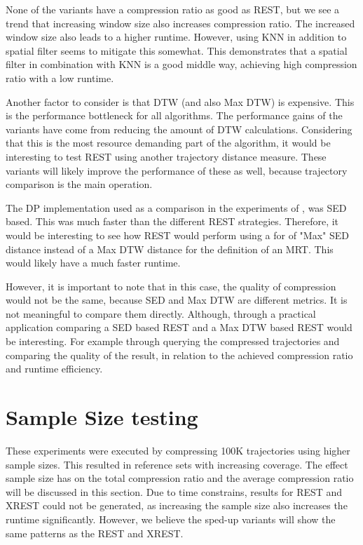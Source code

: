 None of the variants have a compression ratio as good as REST, but we see a trend that increasing window size also increases compression ratio. The increased window size also leads to a higher runtime. However, using KNN in addition to spatial filter seems to mitigate this somewhat. This demonstrates that a spatial filter in combination with KNN is a good middle way, achieving high compression ratio with a low runtime.

Another factor to consider is that DTW (and also Max DTW) is expensive. This is the performance bottleneck for all algorithms. The performance gains of the variants have come from reducing the amount of DTW calculations. Considering that this is the most resource demanding part of the algorithm, it would be interesting to test REST using another trajectory distance measure. These variants will likely improve the performance of these as well, because trajectory comparison is the main operation.

The DP implementation used as a comparison in the experiments of \textcite{zhao2018rest}, was SED based. This was much faster than the different REST strategies. Therefore, it would be interesting to see how REST would perform using a for of "Max" SED distance instead of a Max DTW distance for the definition of an MRT. This would likely have a much faster runtime.

However, it is important to note that in this case, the quality of compression would not be the same, because SED and Max DTW are different metrics. It is not meaningful to compare them directly. Although, through a practical application comparing a SED based REST and a Max DTW based REST would be interesting. For example through querying the compressed trajectories and comparing the quality of the result, in relation to the achieved compression ratio and runtime efficiency.

\section{Sample Size testing}\label{sec:sample_size}
These experiments were executed by compressing 100K trajectories using higher sample sizes. This resulted in reference sets with increasing coverage. The effect sample size has on the total compression ratio and the average compression ratio will be discussed in this section. Due to time constrains, results for REST and XREST could not be generated, as increasing the sample size also increases the runtime significantly. However, we believe the sped-up variants will show the same patterns as the REST and XREST.

